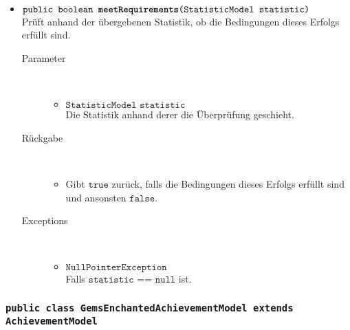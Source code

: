 \begin{description}
\begin{itemize}
		\item $\texttt{public boolean \textbf{meetRequirements}(StatisticModel statistic)}$ \\ Prüft anhand der übergebenen Statistik, ob die Bedingungen dieses Erfolgs erfüllt sind.
		\begin{description}
		\item[Parameter] \hfill \\
			\vspace{-.8cm}
			\begin{itemize}
				\item $\texttt{StatisticModel statistic}$ \\ Die Statistik anhand derer die Überprüfung geschieht. 
			\end{itemize}
			\item[Rückgabe] \hfill \\
			\vspace{-.8cm}
			\begin{itemize}
				\item Gibt $\texttt{true}$ zurück, falls die Bedingungen dieses Erfolgs erfüllt sind und ansonsten $\texttt{false}$.
			\end{itemize}
			\item[Exceptions] \hfill \\
			\vspace{-.8cm}
			\begin{itemize}
				\item $\texttt{NullPointerException}$ \\ Falls $\texttt{statistic == null}$ ist.
			\end{itemize}
		\end{description}		
		
	\end{itemize}
\end{description}

\subsubsection{\normalfont \texttt{public class \textbf{GemsEnchantedAchievementModel} extends AchievementModel}}

